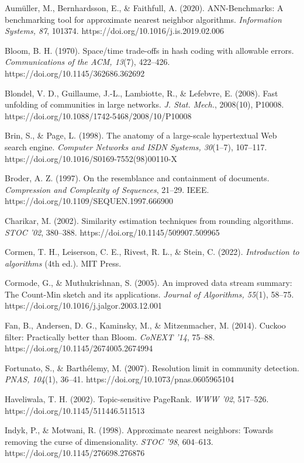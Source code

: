 \setlength{\parindent}{0pt}\setlength{\parskip}{1.5pt}
\renewcommand{\baselinestretch}{0.95}\selectfont
Aumüller, M., Bernhardsson, E., \& Faithfull, A. (2020). ANN-Benchmarks: A benchmarking tool for approximate nearest neighbor algorithms. \emph{Information Systems, 87}, 101374. https://doi.org/10.1016/j.is.2019.02.006

Bloom, B. H. (1970). Space/time trade-offs in hash coding with allowable errors. \emph{Communications of the ACM, 13}(7), 422–426. https://doi.org/10.1145/362686.362692

Blondel, V. D., Guillaume, J.-L., Lambiotte, R., \& Lefebvre, E. (2008). Fast unfolding of communities in large networks. \emph{J. Stat. Mech.}, 2008(10), P10008. https://doi.org/10.1088/1742-5468/2008/10/P10008

Brin, S., \& Page, L. (1998). The anatomy of a large-scale hypertextual Web search engine. \emph{Computer Networks and ISDN Systems, 30}(1–7), 107–117. https://doi.org/10.1016/S0169-7552(98)00110-X

Broder, A. Z. (1997). On the resemblance and containment of documents. \emph{Compression and Complexity of Sequences}, 21–29. IEEE. https://doi.org/10.1109/SEQUEN.1997.666900

Charikar, M. (2002). Similarity estimation techniques from rounding algorithms. \emph{STOC '02}, 380–388. https://doi.org/10.1145/509907.509965

Cormen, T. H., Leiserson, C. E., Rivest, R. L., \& Stein, C. (2022). \emph{Introduction to algorithms} (4th ed.). MIT Press.

Cormode, G., \& Muthukrishnan, S. (2005). An improved data stream summary: The Count-Min sketch and its applications. \emph{Journal of Algorithms, 55}(1), 58–75. https://doi.org/10.1016/j.jalgor.2003.12.001

Fan, B., Andersen, D. G., Kaminsky, M., \& Mitzenmacher, M. (2014). Cuckoo filter: Practically better than Bloom. \emph{CoNEXT '14}, 75–88. https://doi.org/10.1145/2674005.2674994

Fortunato, S., \& Barthélemy, M. (2007). Resolution limit in community detection. \emph{PNAS, 104}(1), 36–41. https://doi.org/10.1073/pnas.0605965104

Haveliwala, T. H. (2002). Topic-sensitive PageRank. \emph{WWW '02}, 517–526. https://doi.org/10.1145/511446.511513

Indyk, P., \& Motwani, R. (1998). Approximate nearest neighbors: Towards removing the curse of dimensionality. \emph{STOC '98}, 604–613. https://doi.org/10.1145/276698.276876

